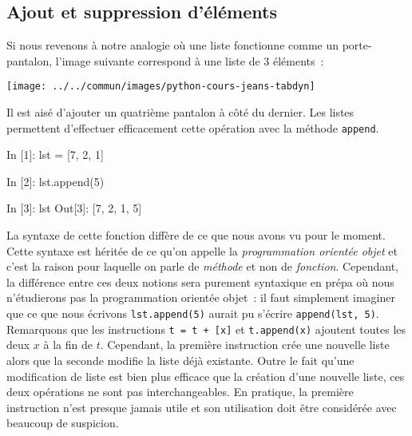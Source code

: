\documentclass{magnolia}
\begin{document}
\subsection{Ajout et suppression d'éléments}

Si nous revenons à notre analogie où une liste fonctionne comme un porte-pantalon,
l'image suivante correspond à une liste de 3 éléments~:

\begin{center}
\texttt{[image: ../../commun/images/python-cours-jeans-tabdyn]}
\end{center}
\noindent
Il est aisé d'ajouter un quatrième pantalon à côté du dernier. Les listes permettent
d'effectuer efficacement cette opération avec la méthode \verb!append!.

\begin{pythoncode}
In [1]: lst = [7, 2, 1]

In [2]: lst.append(5)

In [3]: lst
Out[3]: [7, 2, 1, 5]
\end{pythoncode}
\noindent
La syntaxe de cette fonction diffère de ce que nous avons vu pour le
moment. Cette syntaxe est héritée de ce qu'on appelle la \emph{programmation orientée objet} et c'est
la raison pour laquelle on parle de \emph{méthode} et non de \emph{fonction}. Cependant, la différence
entre ces deux notions sera purement syntaxique en prépa où nous n'étudierons pas la programmation
orientée objet~: il faut simplement imaginer que ce que nous écrivons \verb!lst.append(5)! aurait
pu s'écrire \verb!append(lst, 5)!.\\

Remarquons que les instructions \verb!t = t + [x]! et \verb!t.append(x)! ajoutent toutes les deux $x$ à la fin de 
$t$. Cependant, la première instruction crée une nouvelle liste alors que la seconde modifie la
liste déjà existante. Outre le fait qu'une modification de liste est bien plus efficace que la création
d'une nouvelle liste, ces deux opérations ne sont pas interchangeables.
En pratique, la première instruction n'est presque jamais utile et son utilisation doit être considérée avec
beaucoup de suspicion.\\
\end{document}
